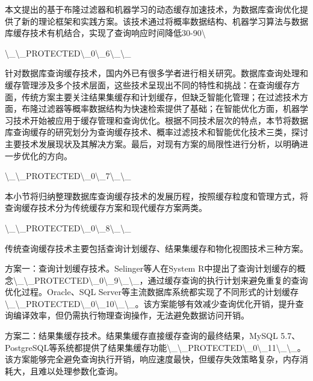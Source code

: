 本文提出的基于布隆过滤器和机器学习的动态缓存加速技术，为数据库查询优化提供了新的理论框架和实践方案。该技术通过将概率数据结构、机器学习算法与数据库缓存技术有机结合，实现了查询响应时间降低30-90\textbackslash{}%

\textbackslash{}_\textbackslash{}_PROTECTED\textbackslash{}_0\textbackslash{}_6\textbackslash{}_\textbackslash{}_

针对数据库查询缓存技术，国内外已有很多学者进行相关研究。数据库查询处理和缓存管理涉及多个技术层面，这些技术呈现出不同的特性和挑战：在查询缓存方面，传统方案主要关注结果集缓存和计划缓存，但缺乏智能化管理；在过滤技术方面，布隆过滤器等概率数据结构为快速检索提供了基础；在智能优化方面，机器学习技术开始被应用于缓存管理和查询优化。根据不同技术层次的特点，本节将数据库查询缓存的研究划分为查询缓存技术、概率过滤技术和智能优化技术三类，探讨主要技术发展现状及其解决方案。最后，对现有方案的局限性进行分析，以明确进一步优化的方向。

\textbackslash{}_\textbackslash{}_PROTECTED\textbackslash{}_0\textbackslash{}_7\textbackslash{}_\textbackslash{}_

本小节将归纳整理数据库查询缓存技术的发展历程，按照缓存粒度和管理方式，将查询缓存技术分为传统缓存方案和现代缓存方案两类。

\textbackslash{}_\textbackslash{}_PROTECTED\textbackslash{}_0\textbackslash{}_8\textbackslash{}_\textbackslash{}_

传统查询缓存技术主要包括查询计划缓存、结果集缓存和物化视图技术三种方案。

方案一：查询计划缓存技术。Selinger等人在System R中提出了查询计划缓存的概念\textbackslash{}_\textbackslash{}_PROTECTED\textbackslash{}_0\textbackslash{}_9\textbackslash{}_\textbackslash{}_，通过缓存查询的执行计划来避免重复的查询优化过程。Oracle、SQL Server等主流数据库系统都实现了不同形式的计划缓存\textbackslash{}_\textbackslash{}_PROTECTED\textbackslash{}_0\textbackslash{}_10\textbackslash{}_\textbackslash{}_。该方案能够有效减少查询优化开销，提升查询编译效率，但仍需执行物理查询操作，无法避免数据访问开销。

方案二：结果集缓存技术。结果集缓存直接缓存查询的最终结果，MySQL 5.7、PostgreSQL等系统都提供了结果集缓存功能\textbackslash{}_\textbackslash{}_PROTECTED\textbackslash{}_0\textbackslash{}_11\textbackslash{}_\textbackslash{}_。该方案能够完全避免查询执行开销，响应速度最快，但缓存失效策略复杂，内存消耗大，且难以处理参数化查询。

